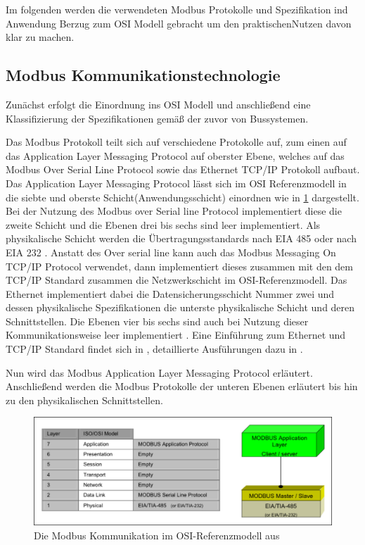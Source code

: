 Im folgenden werden die verwendeten Modbus Protokolle und Spezifikation ind Anwendung Berzug zum OSI Modell gebracht um den praktischenNutzen davon klar zu machen.


\subsection{Modbus Kommunikationstechnologie}
\label{sub:modbus}

Zunächst erfolgt die Einordnung ins OSI Modell und anschließend eine Klassifizierung der Spezifikationen gemäß der zuvor von Bussystemen.

Das Modbus Protokoll teilt sich auf verschiedene Protokolle auf, zum einen auf das Application Layer Messaging Protocol auf oberster Ebene, welches auf das Modbus Over Serial Line Protocol sowie das Ethernet TCP/IP Protokoll aufbaut.
Das Application Layer Messaging Protocol lässt sich im OSI Referenzmodell in die siebte und oberste Schicht(Anwendungsschicht) einordnen wie in \ref{fig:modbusosi} dargestellt. Bei der Nutzung des Modbus over Serial line Protocol implementiert diese die zweite Schicht und die Ebenen drei bis sechs sind leer implementiert. Als physikalische Schicht werden die Übertragungsstandards nach EIA 485 oder nach EIA 232 \cite[S.~2]{mod06ser}.
Anstatt des Over serial line kann auch das Modbus Messaging On TCP/IP Protocol verwendet, dann implementiert dieses zusammen mit den dem TCP/IP Standard zusammen die Netzwerkschicht im OSI-Referenzmodell. Das Ethernet implementiert dabei die Datensicherungsschicht Nummer zwei und dessen physikalische Spezifikationen die unterste physikalische Schicht und deren Schnittstellen. Die Ebenen vier bis sechs sind auch bei Nutzung dieser Kommunikationsweise leer implementiert \cite[S.~2f.]{mod12}. Eine Einführung zum Ethernet und TCP/IP Standard findet sich in \cite{schn06}, detaillierte Ausführungen dazu in \cite{fu03}.

Nun wird das Modbus Application Layer Messaging Protocol erläutert. Anschließend werden die Modbus Protokolle der unteren Ebenen erläutert bis hin zu den physikalischen Schnittstellen.

\begin{figure}
\centering
\includegraphics[width=\textwidth]{abbildungen/20160319_modbusosi}
\caption[Die Modbus Kommunikation im OSI-Referenzmodell]{Die Modbus Kommunikation im OSI-Referenzmodell aus \cite[S.~5]{mod06ser}}
\label{fig:modbusosi}
\end{figure}


